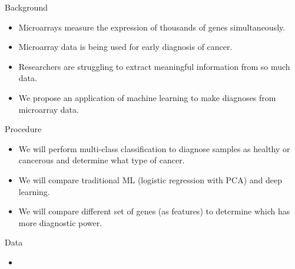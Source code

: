 \documentclass{beamer}
\begin{document}
    \begin{frame}{Background}
        \begin{itemize}\setlength\itemsep{15pt}
            \item {
                Microarrays measure the expression of thousands of genes simultaneously. 
            }
            \item {
                Microarray data is being used for early diagnosis of cancer.
            }
            \item {
                Researchers are struggling to extract meaningful information from so much data.
            }
            \item {
                We propose an application of machine learning to make diagnoses from microarray data.
            }
        \end{itemize}
    \end{frame}

    \begin{frame}{Procedure}
        \begin{itemize} \setlength\itemsep{15pt}
            \item {
                We will perform multi-class classification to diagnose samples
                as healthy or cancerous and determine what type of cancer.
            }
            \item {
                We will compare traditional ML (logistic regression with PCA) 
                and deep learning.
            }
            \item {
                We will compare different set of genes (as features) to determine which
                has more diagnostic power.
            }
        \end{itemize}
    \end{frame}
    
    \begin{frame}{Data}
        \begin{itemize} \setlength\itemsep{15pt}
            \item {
            }
        \end{itemize}
    \end{frame}
\end{document}

